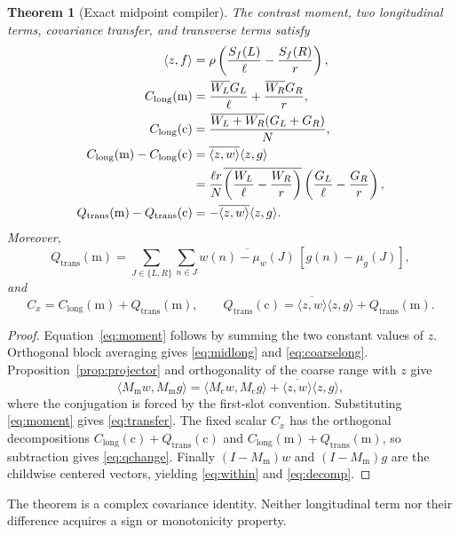 \documentclass[10pt]{article}
\newtheorem{theorem}{Theorem}
\newcommand{\ip}[2]{\langle #1,#2\rangle}
\newcommand{\conj}[1]{\overline{#1}}
\newcommand{\Mc}{M_{\mathrm c}}
\newcommand{\Mm}{M_{\mathrm m}}
\newcommand{\Clc}{C_{\mathrm{long}}(\mathrm c)}
\newcommand{\Clm}{C_{\mathrm{long}}(\mathrm m)}
\newcommand{\Qtc}{Q_{\mathrm{trans}}(\mathrm c)}
\newcommand{\Qtm}{Q_{\mathrm{trans}}(\mathrm m)}
\begin{document}
\begin{theorem}[Exact midpoint compiler]\label{thm:compiler}
The contrast moment, two longitudinal terms, covariance transfer, and
transverse terms satisfy
\begin{align}
 \ip zf
 &=\rho\left(\frac{S_f(L)}\ell-\frac{S_f(R)}r\right),                 \label{eq:moment}\\
 \Clm
 &=\frac{\conj{W_L}G_L}{\ell}+\frac{\conj{W_R}G_R}{r},               \label{eq:midlong}\\
 \Clc
 &=\frac{\conj{W_L+W_R}(G_L+G_R)}N,                                  \label{eq:coarselong}\\
 \Clm-\Clc
 &=\conj{\ip zw}\ip zg                                               \notag\\
 &=\frac{\ell r}{N}
 \conj{\left(\frac{W_L}{\ell}-\frac{W_R}{r}\right)}
 \left(\frac{G_L}{\ell}-\frac{G_R}{r}\right),                      \label{eq:transfer}\\
 \Qtm-\Qtc
 &=-\conj{\ip zw}\ip zg.                                             \label{eq:qchange}
\end{align}
Moreover,
\begin{equation}
 \Qtm=\sum_{J\in\{L,R\}}\sum_{n\in J}
 \conj{w(n)-\mu_w(J)}\,[g(n)-\mu_g(J)],                              \label{eq:within}
\end{equation}
and
\begin{equation}
 C_x=\Clm+\Qtm,\qquad
 \Qtc=\conj{\ip zw}\ip zg+\Qtm.                                    \label{eq:decomp}
\end{equation}
\end{theorem}

\begin{proof}
Equation~\eqref{eq:moment} follows by summing the two constant values of
$z$.  Orthogonal block averaging gives \eqref{eq:midlong} and
\eqref{eq:coarselong}.  Proposition~\ref{prop:projector} and orthogonality of
the coarse range with $z$ give
\[
 \ip{\Mm w}{\Mm g}=\ip{\Mc w}{\Mc g}
 +\conj{\ip zw}\ip zg,
\]
where the conjugation is forced by the first-slot convention.  Substituting
\eqref{eq:moment} gives \eqref{eq:transfer}.  The fixed scalar $C_x$ has the
orthogonal decompositions $\Clc+\Qtc$ and $\Clm+\Qtm$, so subtraction gives
\eqref{eq:qchange}.  Finally $(I-\Mm)w$ and $(I-\Mm)g$ are the childwise
centered vectors, yielding \eqref{eq:within} and \eqref{eq:decomp}.
\end{proof}

The theorem is a complex covariance identity.  Neither longitudinal term nor
their difference acquires a sign or monotonicity property.
\end{document}
